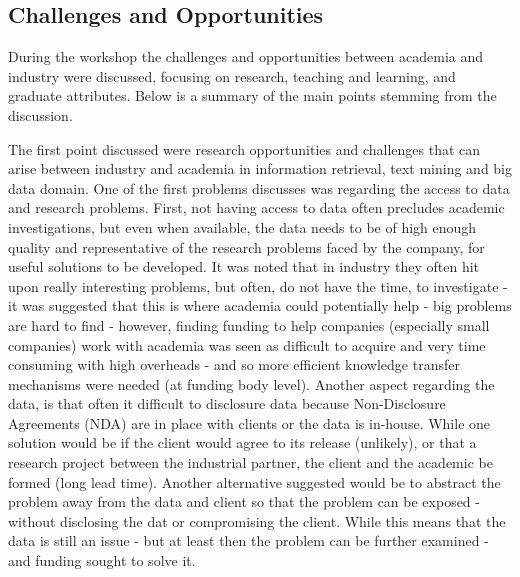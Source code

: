 
\subsection{Challenges and Opportunities}
During the workshop the challenges and opportunities between academia and industry were discussed, focusing on research, teaching and learning, and graduate attributes. Below is a summary of the main points stemming from the discussion.

The first point discussed were research opportunities and challenges that can arise between industry and academia in information retrieval, text mining and big data domain. One of the first problems discusses was regarding the access to data and research problems. First, not having access to data often precludes academic investigations,  but even when available, the data needs to be of high enough quality and representative of the research problems faced by the company, for useful solutions to be developed. It was noted that in industry they often hit upon really interesting problems, but often, do not have the time, to investigate - it was suggested that this is where academia could potentially help - big problems are hard to find - however, finding funding to help companies (especially small companies) work with academia was seen as difficult to acquire and very time consuming with high overheads - and so more efficient knowledge transfer mechanisms were needed (at funding body level). Another aspect regarding the data, is that often it difficult to disclosure data because Non-Disclosure Agreements (NDA) are in place with clients or the data is in-house. While one solution would be if the client would agree to its release (unlikely), or that a research project between the industrial partner, the client and the academic be formed (long lead time). Another alternative suggested would be to abstract the problem away from the data and client so that the problem can be exposed - without disclosing the dat or compromising the client. While this means that the data is still an issue - but at least then the problem can be further examined - and funding sought to solve it.




